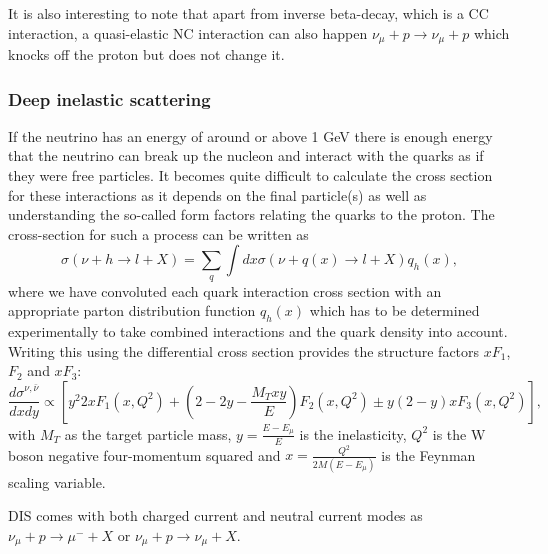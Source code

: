 It is also interesting to note that apart from inverse beta-decay, which is a CC interaction, a quasi-elastic NC interaction can also happen $\nu_\mu + p \rightarrow \nu_\mu + p$ which knocks off the proton but does not change it.


\subsubsection{Deep inelastic scattering}
If the neutrino has an energy of around or above 1 GeV there is enough energy that the neutrino can break up the nucleon and interact with the quarks as if they were free particles. It becomes quite difficult to calculate the cross section for these interactions as it depends on the final particle(s) as well as understanding the so-called form factors relating the quarks to the proton. The cross-section for such a process can be written as
\begin{equation}
 \sigma( \nu + h \rightarrow l + X) = \sum_q \int dx \sigma ( \nu + q(x) \rightarrow l + X) q_h (x),
\end{equation}
where we have convoluted each quark interaction cross section with an appropriate parton distribution function $q_h(x)$ which has to be determined experimentally to take combined interactions and the quark density into account. Writing this using the differential cross section provides the structure factors $xF_1$, $F_2$ and $xF_3$:
\begin{equation}
\frac{d\sigma^{\nu,\bar{\nu}}}{dxdy}\propto \left[ y^2 2xF_1 (x,Q^2) + (2-2y-\frac{M_T xy}{E})F_2 (x,Q^2)\pm y(2-y)xF_3 (x,Q^2)\right],
\end{equation}
 with $M_T$ as the target particle mass, $y=\frac{E-E_\mu}{E}$ is the inelasticity, $Q^2$ is the W boson negative four-momentum squared and $x=\frac{Q^2}{2M(E-E_\mu)}$ is the Feynman scaling variable.

DIS comes with both charged current and neutral current modes as $\nu_\mu + p \rightarrow \mu^- + X$ or $\nu_\mu + p \rightarrow \nu_\mu + X$.

